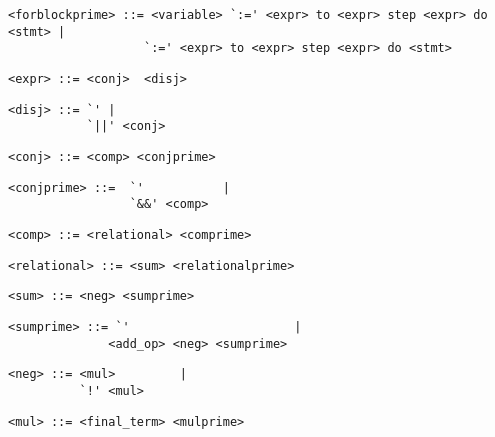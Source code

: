 \begin{footnotesize}
\begin{lstlisting}[frame=single, label={forblockprime}, language=pie]
<forblockprime> ::= <variable> `:=' <expr> to <expr> step <expr> do <stmt> |
                   `:=' <expr> to <expr> step <expr> do <stmt>
\end{lstlisting}

\begin{lstlisting}[frame=single, label={expr}, language=pie]
<expr> ::= <conj>  <disj>
\end{lstlisting}

\begin{lstlisting}[frame=single, label={disj}, language=pie]
<disj> ::= `' |
           `||' <conj>
\end{lstlisting}

\begin{lstlisting}[frame=single, label={conj}, language=pie]
<conj> ::= <comp> <conjprime>
\end{lstlisting}

\begin{lstlisting}[frame=single, label={conjprime}, language=pie]
<conjprime> ::=  `'           | 
                 `&&' <comp>
\end{lstlisting}

\begin{lstlisting}[frame=single, label={comp}, language=pie]
<comp> ::= <relational> <comprime>
\end{lstlisting}

\begin{lstlisting}[frame=single, label={relational}, language=pie]
<relational> ::= <sum> <relationalprime>
\end{lstlisting}

\begin{lstlisting}[frame=single, label={sum}, language=pie]
<sum> ::= <neg> <sumprime>
\end{lstlisting}

\begin{lstlisting}[frame=single, label={sumprime}, language=pie]
<sumprime> ::= `'                       | 
              <add_op> <neg> <sumprime>
\end{lstlisting}

\begin{lstlisting}[frame=single, label={neg}, language=pie]
<neg> ::= <mul>         | 
          `!' <mul>
\end{lstlisting}

\begin{lstlisting}[frame=single, label={mul}, language=pie]
<mul> ::= <final_term> <mulprime>
\end{lstlisting}


\end{footnotesize}
